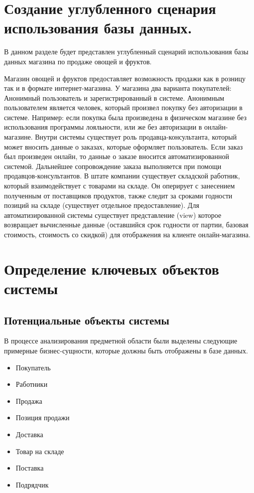 \documentclass[14pt]{extreport}
\begin{document}
\chapter{Создание углубленного сценария использования базы данных.}

В данном разделе будет представлен углубленный сценарий использования базы данных магазина по продаже овощей и фруктов.


Магазин овощей и фруктов предоставляет возможность продажи как в розницу так и в формате интернет-магазина. У магазина два варианта покупателей: Анонимный пользователь и зарегистрированный в системе. Анонимным пользователем является человек, который произвел покупку без авторизации в системе. Например: если покупка была произведена в физическом магазине без использования программы лояльности, или же без авторизации в онлайн-магазине. Внутри системы существует роль продавца-консультанта, который может вносить данные о заказах, которые оформляет пользователь. Если заказ был произведен онлайн, то данные о заказе вносится автоматизированной системой. Дальнейшее сопровождение заказа выполняется при помощи продавцов-консультантов. В штате компании существует складской работник, который взаимодействует с товарами на складе. Он оперирует с занесением полученным от поставщиков продуктов, также следит за сроками годности позиций на складе (существует отдельное предоставление). Для автоматизированной системы существует представление (view) которое возвращает вычисленные данные (оставшийся срок годности от партии, базовая стоимость, стоимость со скидкой) для отображения на клиенте онлайн-магазина.

\chapter{Определение ключевых объектов системы}

    \section{Потенциальные объекты системы}
        В процессе анализирования предметной области были выделены следующие примерные бизнес-сущности, которые должны быть отображены в базе данных.

        \begin{itemize}
            \item Покупатель
            \item Работники
            \item Продажа
            \item Позиция продажи
            \item Доставка
            \item Товар на складе
            \item Поставка
            \item Подрядчик
        \end{itemize}
    
\end{document}

